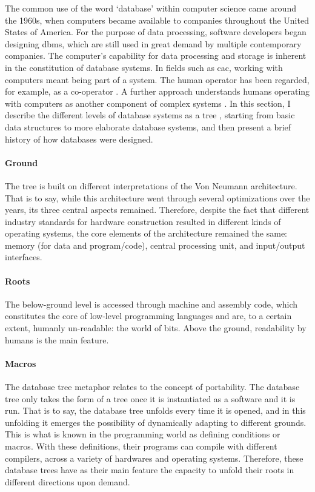 The common use of the word `database' within computer science came around the 1960s, when computers became available to companies throughout the United States of America. For the purpose of data processing, software developers began designing \gls{dbms}, which are still used in great demand by multiple contemporary companies. The computer's capability for data processing and storage is inherent in the constitution of database systems. In fields such as \gls{cac}, working with computers meant being part of a system. The human operator has been regarded, for example, as a co-operator \parencite{Mat63:The}. A further approach understands humans operating with computers as another component of complex systems \parencite{Vag01:Som}. In this section, I describe the different levels of database systems as a tree , starting from basic data structures to more elaborate database systems, and then present a brief history of how databases were designed.


\paragraph{Ground}
The tree is built on different interpretations of the Von Neumann architecture. That is to say, while this architecture went through several optimizations over the years, its three central aspects remained. Therefore, despite the fact that different industry standards for hardware construction resulted in different kinds of operating systems, the core elements of the architecture remained the same: memory (for data and program/code), central processing unit, and input/output interfaces.

\paragraph{Roots}
The below-ground level is accessed through machine and assembly code, which constitutes the core of low-level programming languages and are, to a certain extent, humanly un-readable: the world of bits. Above the ground, readability by humans is the main feature.

\paragraph{Macros}
\label{portability}
The database tree metaphor relates to the concept of portability. The database tree only takes the form of a tree once it is instantiated as a software and it is run. That is to say, the database tree unfolds every time it is opened, and in this unfolding it emerges the possibility of dynamically adapting to different grounds. This is what is known in the programming world as defining conditions or macros. With these definitions, their programs can compile with different compilers, across a variety of hardwares and operating systems. Therefore, these database trees have as their main feature the capacity to unfold their roots in different directions upon demand. 

